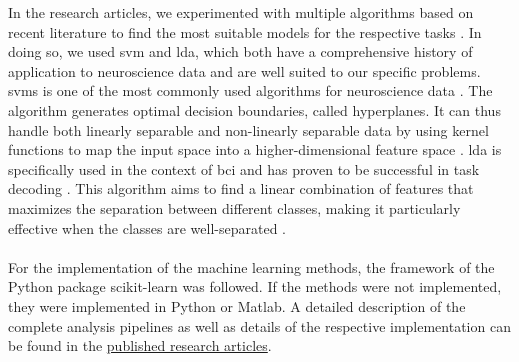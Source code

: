 \noindent In the research articles, we experimented with multiple algorithms based on recent literature to find the most suitable models for the respective tasks \cite{shoorangiz2021eeg}. In doing so, we used \gls{svm} and \gls{lda}, which both have a comprehensive history of application to neuroscience data and are well suited to our specific problems.  \Glspl{svm} is one of the most commonly used algorithms for neuroscience data \cite{VAROQUAUX2017166}. The algorithm generates optimal decision boundaries, called hyperplanes. It can thus handle both linearly separable and non-linearly separable data by using kernel functions to map the input space into a higher-dimensional feature space \cite{shoorangiz2021eeg}. \Gls{lda} is specifically used in the context of \Gls{bci} and has proven to be successful in task decoding \cite{Blankertz2008}. This algorithm aims to find a linear combination of features that maximizes the separation between different classes, making it particularly effective when the classes are well-separated \cite{shoorangiz2021eeg}.\\
\\
For the implementation of the machine learning methods, the framework of the Python package scikit-learn was followed. If the methods were not implemented, they were implemented in Python or Matlab. A detailed description of the complete analysis pipelines as well as details of the respective implementation can be found in the \hyperref[{pub:reserach_articles}]{published research articles}. 


